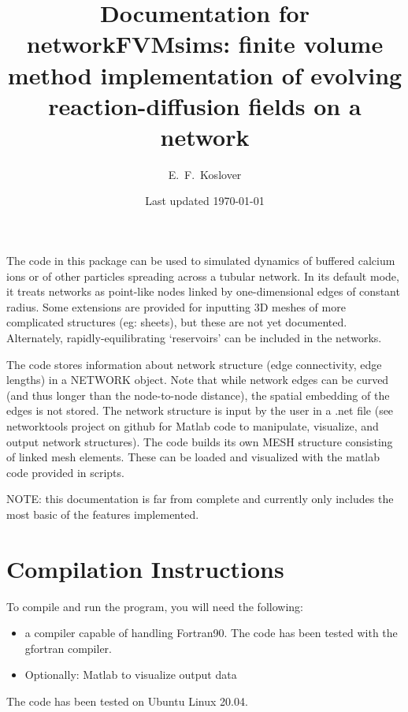 \documentclass[12pt]{article}
\begin{document}
\title{\vspace{-2cm}Documentation for networkFVMsims: finite volume method implementation of evolving reaction-diffusion fields on a network}
\author{E.~F.~Koslover}
\date{Last updated \today}
\maketitle

The code in this package can be used to simulated dynamics of buffered calcium ions or of other particles spreading across a tubular network. In its default mode, it treats networks as point-like nodes linked by one-dimensional edges of constant radius. Some extensions are provided for inputting 3D meshes of more complicated structures (eg: sheets), but these are not yet documented. Alternately, rapidly-equilibrating `reservoirs' can be included in the networks.

The code stores information about network structure (edge connectivity, edge lengths) in a NETWORK object. Note that while network edges can be curved (and thus longer than the node-to-node distance), the spatial embedding of the edges is not stored. The network structure is input by the user in a .net file (see networktools project on github for Matlab code to manipulate, visualize, and output network structures). The code builds its own MESH structure consisting of linked mesh elements. These can be loaded and visualized with the matlab code provided in scripts.

NOTE: this documentation is far from complete and currently only includes the most basic of the features implemented.

\section{Compilation Instructions}
To compile and run the program, you will need the following:
\begin{itemize}
\item a compiler capable of handling Fortran90.
The code has been tested with the gfortran compiler.
\item Optionally: Matlab to visualize output data
\end{itemize}

The code has been tested on Ubuntu Linux 20.04.
\end{document}

